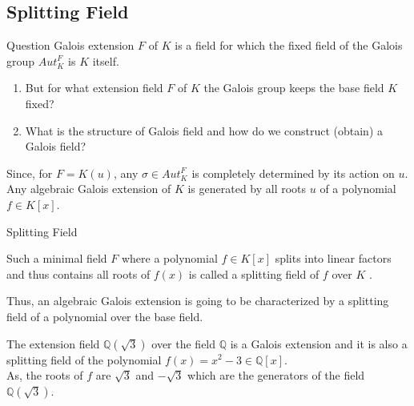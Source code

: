 \documentclass{beamer}
\begin{document}
\subsection{Splitting Field}
\begin{frame}{Question}
  Galois extension \(F\) of  \(K\) is a field for which the fixed field of the Galois group \(Aut_K^F\) is \(K\) itself.
  \vspace{3mm}

  \begin{tcolorbox}[colframe=red, boxsep=1mm, title={\bfseries \color{white} Questions:}]
    \begin{enumerate}
    \item  But for what extension field \(F\) of \(K\) the Galois group keeps the base field \(K\) fixed?
    \item What is the structure of Galois field and how do we construct (obtain) a Galois field?
    \end{enumerate}
  \end{tcolorbox}
  \vspace{3mm}

  Since, for \(F=K(u)\), any \(\sigma \in Aut_K^F\) is completely determined by its action on \(u\). Any algebraic Galois extension of \(K\) is generated by all roots \(u\) of a polynomial \(f \in K[x]\).
\end{frame}

\begin{frame}{Splitting Field}

     Such a minimal field \(F\) where a polynomial \(f \in K[x]\) splits into linear factors and thus contains all roots of \(f(x)\) is called a splitting field of \(f\) over \(K\) \cite{hunger}.
 \vspace{3mm}

 Thus, an algebraic Galois extension is going to be characterized by a splitting field of a polynomial over the base field.

 \vspace{3mm}
 \begin{tcolorbox}[colframe=brown!80!black, boxsep=1mm, title={\bfseries \color{white} Example}]
   The extension field \(\mathbb{Q}(\sqrt{3})\) over the field \(\mathbb{Q}\) is a Galois extension and it is also a splitting field of the polynomial \(f(x)=x^2-3 \in \mathbb{Q}[x]\).\\

   As, the roots of \(f\) are \(\sqrt{3}\) and \(-\sqrt{3}\) which are the generators of the field \(\mathbb{Q}(\sqrt{3})\).
 \end{tcolorbox}
\end{frame}
\end{document}
